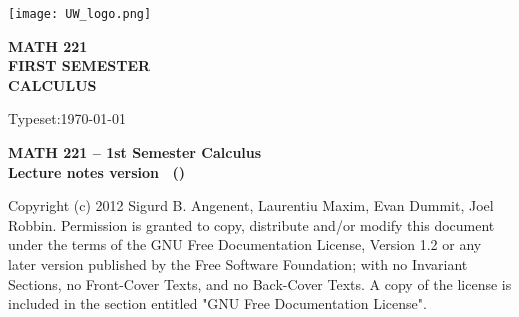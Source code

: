 %
\texttt{[image: UW\_logo.png]}
\vfill

\begin{flushright}
  \Huge\sffamily\bfseries
  MATH 221 \\
  FIRST SEMESTER \\
  CALCULUS\\[1in]
  \large \semester
\end{flushright}

\vfill
\begin{flushright}
\textsf{Typeset:\today}
\end{flushright}

\newpage
\begin{center}
  \bfseries\sffamily MATH 221 -- 1st Semester Calculus \\
  Lecture notes version \version\ (\semester)
\end{center}

\begin{center}
  Copyright (c) 2012 Sigurd B. Angenent, Laurentiu Maxim, Evan Dummit, Joel Robbin.
  Permission is granted to copy, distribute and/or modify this document under
  the terms of the GNU Free Documentation License, Version 1.2 or any later
  version published by the Free Software Foundation; with no Invariant Sections,
  no Front-Cover Texts, and no Back-Cover Texts.  A copy of the license is
  included in the section entitled "GNU Free Documentation License".
\end{center}
\newpage
\sffamily\footnotesize
\begin{multicols}{2}
    \tableofcontents
\end{multicols}

\rmfamily\normalsize



